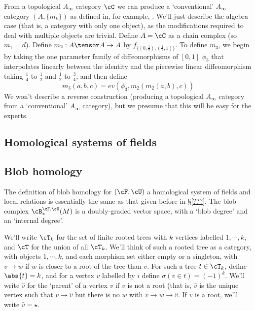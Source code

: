 From a topological $A_\infty$ category $\cC$ we can produce a `conventional' $A_\infty$ category $(A, \{m_k\})$ as defined in, for example, \cite{Keller}. We'll just describe the algebra case (that is, a category with only one object), as the modifications required to deal with multiple objects are trivial. Define $A = \cC$ as a chain complex (so $m_1 = d$). Define $m_2 : A\tensor A \to A$ by $f_{\{(0,\frac{1}{2}),(\frac{1}{2},1)\}}$. To define $m_3$, we begin by taking the one parameter family of diffeomorphisms of $[0,1]$ $\phi_3$ that interpolates linearly between the identity and the piecewise linear diffeomorphism taking $\frac{1}{4}$ to $\frac{1}{2}$ and $\frac{1}{2}$ to $\frac{3}{4}$, and then define
\begin{equation*}
m_3(a,b,c) = ev(\phi_3, m_2(m_2(a,b), c))
\end{equation*}
We won't describe a reverse construction (producing a topological $A_\infty$ category from a `conventional' $A_\infty$ category), but we presume that this will be easy for the experts.

\subsection{Homological systems of fields}

\subsection{Blob homology}
The definition of blob homology for $(\cF, \cU)$ a homological system of fields and local relations is essentially the same as that given before in \S \ref{???}.
The blob complex $\cB_*^{\cF,\cU}(M)$ is a doubly-graded vector space, with a `blob degree' and an `internal degree'. 

We'll write $\cT_k$ for the set of finite rooted trees with $k$ vertices labelled $1, \cdots, k$, and $\cT$ for the union of all $\cT_k$. We'll think of such a rooted tree as a category, with objects $1, \cdots, k$, and each morphism set either empty or a singleton, with $v \to w$ if $w$ is closer to a root of the tree than $v$. For such a tree $t \in \cT_k$, define $\abs{t} = k$, and for a vertex $v$ labelled by $i$ define $\sigma(v \in t) = (-1)^k$. We'll write $\hat{v}$ for the `parent' of a vertex $v$ if $v$ is not a root (that is, $\hat{v}$ is the unique vertex such that $v \to \hat{v}$ but there is no $w$ with $v \to w \to \hat{v}$. If $v$ is a root, we'll write $\hat{v}=\star$.


